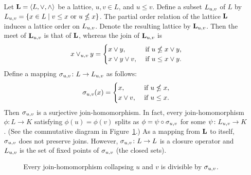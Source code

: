 \begin{example}
  Let $\mathbf{L} = \langle L, \vee, \wedge\rangle$ be a lattice, $u, v \in L$, and $u\leq v$.
  Define a subset $L_{u,v}$ of $L$ by
  $L_{u,v} =\{x\in L \mid v\leq x \text{ or } u \nleq x\}$.
  The partial order relation of the lattice $\mathbf{L}$ induces a lattice order on
  $L_{u,v}$. Denote the resulting lattice by $\mathbf{L}_{u,v}$.
  Then the meet of $\mathbf{L}_{u,v}$ is that of $\mathbf{L}$, whereas the join of $\mathbf{L}_{u,v}$ is
  \[
  x \vee_{u,v} y = 
  \begin{cases}
    x \vee y, & \text{ if $u \nleq x \vee y$,}\\
    x \vee y \vee v, & \text{ if $u \leq x \vee y$.}
  \end{cases}
  \]
  Define a mapping $\sigma_{u,v} \colon L \to L_{u,v}$ as follows:
  \[
  \sigma_{u,v} (x)  = 
  \begin{cases}
    x, & \text{ if $u \nleq x$,}\\
    x \vee v, & \text{ if $u \leq x$.}
  \end{cases}
  \]
  Then $\sigma_{u,v}$ is a surjective join-homomorphism. In fact, every
  join-homomorphism $\phi \colon L \to K$ satisfying $\phi(u) = \phi(v)$ splits as
  $\phi =  \psi \circ \sigma_{u,v}$ for some $\psi \colon L_{u,v} \to K$.
  (See the commutative diagram in Figure~\ref{fig:splitting}.)
  As a mapping from $\mathbf{L}$ to itself, $\sigma_{u,v}$ does not preserve joins. However,
  $\sigma_{u,v} \colon L \to L$ is a closure operator and 
  $L_{u,v}$ is the set of fixed points of $\sigma_{u,v}$ (the closed sets).

  \begin{center}
    \begin{figure}[h]
      \caption{Every join-homomorphism collapsing $u$ and $v$ is divisible by $\sigma_{u,v}$.}
      \label{fig:splitting}
    \end{figure}
  \end{center}

  
\end{example}


